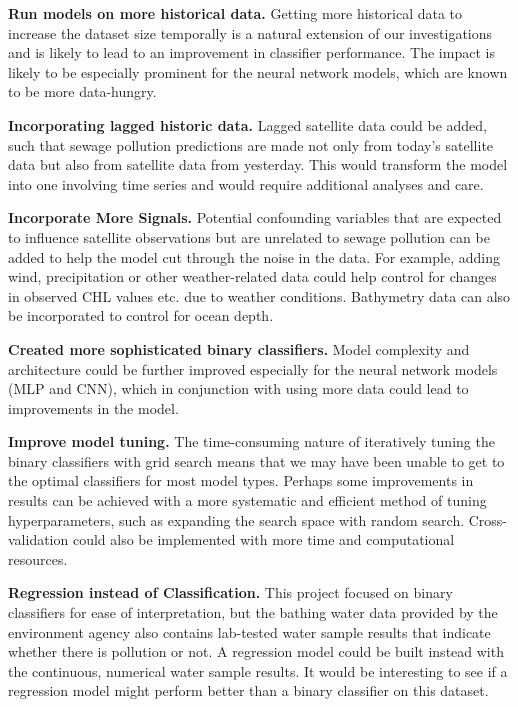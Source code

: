 \documentclass[a4paper,11pt]{report}
\begin{document}
\noindent \textbf{Run models on more historical data.} 
Getting more historical data to increase the dataset size temporally is a natural extension of our investigations and is likely to lead to an improvement in classifier performance. The impact is likely to be especially prominent for the neural network models, which are known to be more data-hungry. 

\noindent \textbf{Incorporating lagged historic data.}
Lagged satellite data could be added, such that sewage pollution predictions are made not only from today's satellite data but also from satellite data from yesterday. This would transform the model into one involving time series and would require additional analyses and care. 

\noindent \textbf{Incorporate More Signals.}
Potential confounding variables that are expected to influence satellite observations but are unrelated to sewage pollution can be added to help the model cut through the noise in the data. For example, adding wind, precipitation or other weather-related data could help control for changes in observed CHL values etc. due to weather conditions. Bathymetry data can also be incorporated to control for ocean depth. 

\noindent \textbf{Created more sophisticated binary classifiers.}
Model complexity and architecture could be further improved especially for the neural network models (MLP and CNN), which in conjunction with using more data could lead to improvements in the model. 

\noindent \textbf{Improve model tuning.}
The time-consuming nature of iteratively tuning the binary classifiers with grid search means that we may have been unable to get to the optimal classifiers for most model types. Perhaps some improvements in results can be achieved with a more systematic and efficient method of tuning hyperparameters, such as expanding the search space with random search. Cross-validation could also be implemented with more time and computational resources.

\noindent \textbf{Regression instead of Classification.}
This project focused on binary classifiers for ease of interpretation, but the bathing water data provided by the environment agency also contains lab-tested water sample results that indicate whether there is pollution or not. A regression model could be built instead with the continuous, numerical water sample results. It would be interesting to see if a regression model might perform better than a binary classifier on this dataset.
\end{document}

